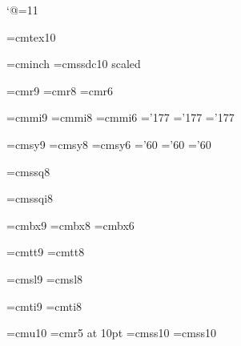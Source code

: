  
\catcode`@=11 %
 
\font\tentex=cmtex10 
 
\font\inchhigh=cminch 
\font\titlefont=cmssdc10 scaled%
 
\font\ninerm=cmr9 
\font\eightrm=cmr8 
\font\sixrm=cmr6 
 
\font\ninei=cmmi9 
\font\eighti=cmmi8 
\font\sixi=cmmi6 
\skewchar\ninei='177 \skewchar\eighti='177 \skewchar\sixi='177 
 
\font\ninesy=cmsy9 
\font\eightsy=cmsy8 
\font\sixsy=cmsy6 
\skewchar\ninesy='60 \skewchar\eightsy='60 \skewchar\sixsy='60 
 
\font\eightss=cmssq8 
 
\font\eightssi=cmssqi8 
 
\font\ninebf=cmbx9 
\font\eightbf=cmbx8 
\font\sixbf=cmbx6 
 
\font\ninett=cmtt9 
\font\eighttt=cmtt8 
 
\hyphenchar{} %
\hyphenchar{} 
\hyphenchar{} 
 
\font\ninesl=cmsl9 
\font\eightsl=cmsl8 
 
\font\nineit=cmti9 
\font\eightit=cmti8 
 
\font\tenu=cmu10 %
\font\magnifiedfiverm=cmr5 at 10pt 
\font\manual=cmss10 %
\font\cmman=cmss10 %
 
\newskip\ttglue 
\def\tenpoint{\def\rm{\fam0\tenrm}%
  \textfont0=\tenrm \scriptfont0=\sevenrm \scriptscriptfont0=\fiverm 
  \textfont1=\teni \scriptfont1=\seveni \scriptscriptfont1=\fivei 
  \textfont2=\tensy \scriptfont2=\sevensy \scriptscriptfont2=\fivesy 
  \textfont3=\tenex \scriptfont3=\tenex \scriptscriptfont3=\tenex 
  \def\it{\fam\itfam\tenit}%
  \textfont\itfam=\tenit 
  \def\sl{\fam\slfam\tensl}%
  \textfont\slfam=\tensl 
  \def\bf{\fam\bffam\tenbf}%
  \textfont\bffam=\tenbf \scriptfont\bffam=\sevenbf 
   \scriptscriptfont\bffam=\fivebf 
  \def\tt{\fam\ttfam\tentt}%
  \textfont\ttfam=\tentt 
  \tt \ttglue=.5em plus.25em minus.15em 
  \normalbaselineskip=12pt 
  \def\MF{{\manual META}\-{\manual FONT}}%
  \let\sc=\eightrm 
  \let\big=\tenbig 
  \setbox\strutbox=\hbox{\vrule height8.5pt depth3.5pt width\z@}%
  \normalbaselines\rm} 
 
